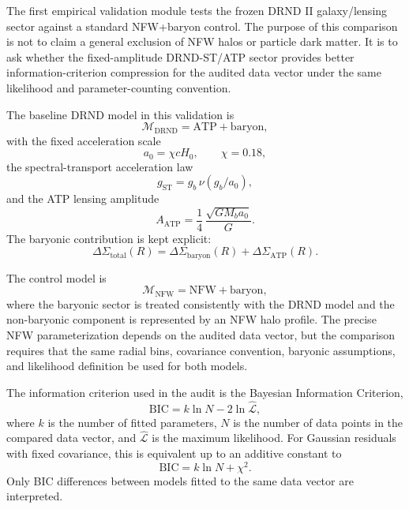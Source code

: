 \documentclass[12pt]{iopart}
\begin{document}
The first empirical validation module tests the frozen DRND II galaxy/lensing sector against a standard NFW+baryon control. The purpose of this comparison is not to claim a general exclusion of NFW halos or particle dark matter. It is to ask whether the fixed-amplitude DRND-ST/ATP sector provides better information-criterion compression for the audited data vector under the same likelihood and parameter-counting convention.

The baseline DRND model in this validation is
\begin{equation}
\mathcal{M}_{\mathrm{DRND}}
=
\mathrm{ATP+baryon},
\end{equation}
with the fixed acceleration scale
\begin{equation}
a_0=\chi cH_0,
\qquad
\chi=0.18,
\end{equation}
the spectral-transport acceleration law
\begin{equation}
g_{\mathrm{ST}}
=
g_b\,\nu(g_b/a_0),
\end{equation}
and the ATP lensing amplitude
\begin{equation}
A_{\mathrm{ATP}}
=
\frac14\,\frac{\sqrt{GM_ba_0}}{G}.
\end{equation}
The baryonic contribution is kept explicit:
\begin{equation}
\Delta\Sigma_{\mathrm{total}}(R)
=
\Delta\Sigma_{\mathrm{baryon}}(R)
+
\Delta\Sigma_{\mathrm{ATP}}(R).
\end{equation}

The control model is
\begin{equation}
\mathcal{M}_{\mathrm{NFW}}
=
\mathrm{NFW+baryon},
\end{equation}
where the baryonic sector is treated consistently with the DRND model and the non-baryonic component is represented by an NFW halo profile. The precise NFW parameterization depends on the audited data vector, but the comparison requires that the same radial bins, covariance convention, baryonic assumptions, and likelihood definition be used for both models.

The information criterion used in the audit is the Bayesian Information Criterion,
\begin{equation}
\mathrm{BIC}
=
k\ln N
-
2\ln \hat{\mathcal{L}},
\label{eq:bic_def}
\end{equation}
where \(k\) is the number of fitted parameters, \(N\) is the number of data points in the compared data vector, and \(\hat{\mathcal{L}}\) is the maximum likelihood. For Gaussian residuals with fixed covariance, this is equivalent up to an additive constant to
\begin{equation}
\mathrm{BIC}
=
k\ln N+\chi^2.
\end{equation}
Only BIC differences between models fitted to the same data vector are interpreted.
\end{document}
